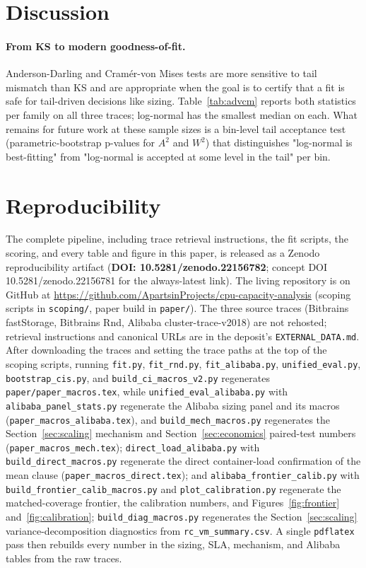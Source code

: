 \documentclass[11pt,a4paper]{article}
\begin{document}
\section{Discussion}

\paragraph{From KS to modern goodness-of-fit.}
Anderson-Darling and Cram\'er-von Mises tests are more sensitive to tail
mismatch than KS and are appropriate when the goal is to certify that a fit
is safe for tail-driven decisions like sizing. Table~\ref{tab:advcm}
reports both statistics per family on all three traces; log-normal has
the smallest median on each. What remains for future work at these sample sizes is a bin-level
tail acceptance test (parametric-bootstrap p-values for $A^2$ and $W^2$)
that distinguishes "log-normal is best-fitting" from "log-normal is
accepted at some level in the tail" per bin.

\section{Reproducibility}
\label{sec:reproducibility}
The complete pipeline, including trace retrieval instructions, the fit
scripts, the scoring, and every table and figure in this paper, is
released as a Zenodo reproducibility artifact
(\textbf{DOI: 10.5281/zenodo.22156782}; concept DOI 10.5281/zenodo.22156781
for the always-latest link). The living repository is on GitHub at
\url{https://github.com/ApartsinProjects/cpu-capacity-analysis} (scoping
scripts in \texttt{scoping/}, paper build in \texttt{paper/}). The three
source traces (Bitbrains fastStorage, Bitbrains Rnd, Alibaba
cluster-trace-v2018) are not rehosted; retrieval instructions and
canonical URLs are in the deposit's \texttt{EXTERNAL\_DATA.md}. After
downloading the traces and setting the trace paths at the top of the
scoping scripts, running \texttt{fit.py}, \texttt{fit\_rnd.py},
\texttt{fit\_alibaba.py}, \texttt{unified\_eval.py},
\texttt{bootstrap\_cis.py}, and \texttt{build\_ci\_macros\_v2.py}
regenerates \texttt{paper/paper\_macros.tex}, while
\texttt{unified\_eval\_alibaba.py} with \texttt{alibaba\_panel\_stats.py}
regenerate the Alibaba sizing panel and its macros
(\texttt{paper\_macros\_alibaba.tex}), and \texttt{build\_mech\_macros.py}
regenerates the Section~\ref{sec:scaling} mechanism and
Section~\ref{sec:economics} paired-test numbers
(\texttt{paper\_macros\_mech.tex}); \texttt{direct\_load\_alibaba.py}
with \texttt{build\_direct\_macros.py} regenerate the direct
container-load confirmation of the mean clause
(\texttt{paper\_macros\_direct.tex}); and
\texttt{alibaba\_frontier\_calib.py} with
\texttt{build\_frontier\_calib\_macros.py} and
\texttt{plot\_calibration.py} regenerate the matched-coverage frontier,
the calibration numbers, and Figures~\ref{fig:frontier}
and~\ref{fig:calibration}; \texttt{build\_diag\_macros.py} regenerates the
Section~\ref{sec:scaling} variance-decomposition diagnostics from
\texttt{rc\_vm\_summary.csv}. A single \texttt{pdflatex} pass then
rebuilds every number in the sizing, SLA, mechanism, and Alibaba tables
from the raw traces.
\end{document}
